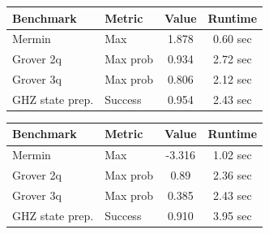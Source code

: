 \documentclass[9pt,a4paper]{src/templates/tau-class/tau}
\begin{document}
\noindent\begin{minipage}{0.48\textwidth}
\setlength{\tabcolsep}{3pt}
\begin{center}
\begin{tabular}{@{}l l c c@{}}  %
\toprule
Benchmark & Metric & Value & Runtime \\  %
\midrule

Mermin & Max & 1.878 & 0.60 sec \\  %


Grover 2q & Max prob & 0.934 & 2.72 sec \\  %


Grover 3q & Max prob & 0.806 & 2.12 sec \\  %


GHZ state prep. & Success & 0.954 & 2.43 sec \\  %











\bottomrule
\end{tabular}
\end{center}
\end{minipage}
\hfill
\begin{minipage}{0.48\textwidth}
\setlength{\tabcolsep}{3pt}
\begin{center}
\begin{tabular}{@{}l l c c@{}}  %
\toprule
Benchmark & Metric & Value & Runtime \\  %
\midrule

Mermin & Max & -3.316 & 1.02 sec \\  %


Grover 2q & Max prob & 0.89 & 2.36 sec \\  %


Grover 3q & Max prob & 0.385 & 2.43 sec \\  %


GHZ state prep. & Success & 0.910 & 3.95 sec \\  %











\bottomrule
\end{tabular}
\end{center}
\end{minipage}
\end{document}
